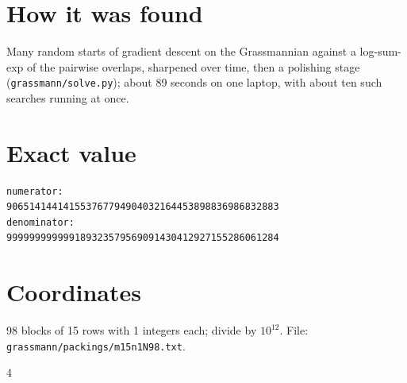\documentclass[11pt,a4paper]{article}
\begin{document}
\section{How it was found}
Many random starts of gradient descent on the Grassmannian against a log-sum-exp of the pairwise overlaps, sharpened over time, then a polishing stage (\texttt{grassmann/solve.py}); about 89 seconds on one laptop, with about ten such searches running at once.


\appendix
\section{Exact value}
{\small
\begin{verbatim}
numerator:
906514144141553767794904032164453898836986832883
denominator:
999999999999189323579569091430412927155286061284
\end{verbatim}}

\section{Coordinates}
98 blocks of 15 rows with 1 integers each; divide by $10^{12}$. File: \texttt{grassmann/packings/m15n1N98.txt}.
{\tiny
\begin{multicols}{4}
\end{multicols}}
\end{document}
